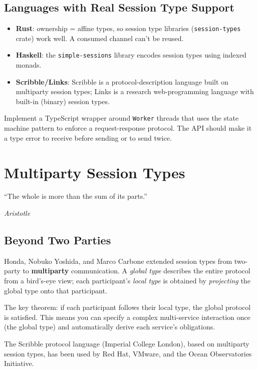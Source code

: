 \documentclass[11pt, a4paper, oneside]{book}
\newcommand{\lc}[1]{\texttt{#1}}
\newcounter{exercise}[chapter]
\begin{document}
\section{Languages with Real Session Type Support}

\begin{itemize}[nosep]
\item \textbf{Rust}: ownership = affine types, so session type libraries
  (\lc{session-types} crate) work well. A consumed channel can't be reused.
\item \textbf{Haskell}: the \lc{simple-sessions} library encodes session
  types using indexed monads.
\item \textbf{Scribble/Links}: Scribble is a protocol-description language
  built on multiparty session types; Links is a research web-programming
  language with built-in (binary) session types.
\end{itemize}

\begin{exercisebox}[title={Exercise 10.1}]
Implement a TypeScript wrapper around \lc{Worker} threads that uses the
state machine pattern to enforce a request-response protocol. The API should
make it a type error to receive before sending or to send twice.
\end{exercisebox}

\chapter{Multiparty Session Types}

\epigraph{``The whole is more than the sum of its parts.''}%
{\textit{Aristotle}}

\section{Beyond Two Parties}

\begin{historical}[title={Honda, Yoshida, and Carbone (2008)}]
Honda, Nobuko Yoshida, and Marco Carbone extended session types from two-party
to \textbf{multiparty} communication. A \emph{global type} describes the
entire protocol from a bird's-eye view; each participant's \emph{local type}
is obtained by \emph{projecting} the global type onto that participant.

The key theorem: if each participant follows their local type, the global
protocol is satisfied. This means you can specify a complex multi-service
interaction once (the global type) and automatically derive each service's
obligations.

The Scribble protocol language (Imperial College London), based on multiparty
session types, has been used by Red Hat, VMware, and the Ocean Observatories
Initiative.
\end{historical}
\end{document}
